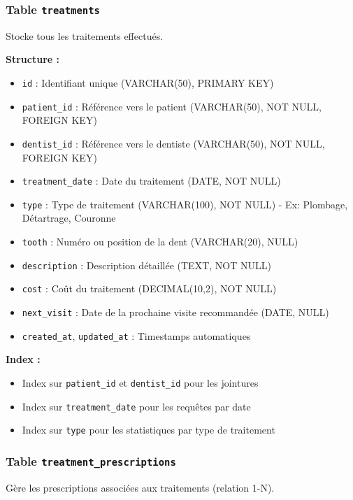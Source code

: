 \documentclass[12pt,a4paper]{report}
\begin{document}
\subsubsection{Table \texttt{treatments}}

Stocke tous les traitements effectués.

\textbf{Structure :}
\begin{itemize}
    \item \texttt{id} : Identifiant unique (VARCHAR(50), PRIMARY KEY)
    \item \texttt{patient\_id} : Référence vers le patient (VARCHAR(50), NOT NULL, FOREIGN KEY)
    \item \texttt{dentist\_id} : Référence vers le dentiste (VARCHAR(50), NOT NULL, FOREIGN KEY)
    \item \texttt{treatment\_date} : Date du traitement (DATE, NOT NULL)
    \item \texttt{type} : Type de traitement (VARCHAR(100), NOT NULL) - Ex: Plombage, Détartrage, Couronne
    \item \texttt{tooth} : Numéro ou position de la dent (VARCHAR(20), NULL)
    \item \texttt{description} : Description détaillée (TEXT, NOT NULL)
    \item \texttt{cost} : Coût du traitement (DECIMAL(10,2), NOT NULL)
    \item \texttt{next\_visit} : Date de la prochaine visite recommandée (DATE, NULL)
    \item \texttt{created\_at}, \texttt{updated\_at} : Timestamps automatiques
\end{itemize}

\textbf{Index :}
\begin{itemize}
    \item Index sur \texttt{patient\_id} et \texttt{dentist\_id} pour les jointures
    \item Index sur \texttt{treatment\_date} pour les requêtes par date
    \item Index sur \texttt{type} pour les statistiques par type de traitement
\end{itemize}

\subsubsection{Table \texttt{treatment\_prescriptions}}

Gère les prescriptions associées aux traitements (relation 1-N).
\end{document}
